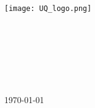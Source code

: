 \begin{titlepage} 
	
	\center %
	
	\texttt{[image: UQ\_logo.png]}\\[1.7cm]	
	
	
	\textsc{\LARGE \institution}\\[1.2cm] 
	
	\textsc{\Large \courseCode}\\[0.7cm] 
	
	\textsc{\large \courseTitle}\\[0.7cm] 
	
	\HRule\\[0.65cm]
	
	{\huge\bfseries \documentTitle}\\[0.3cm]
	
	\HRule\\[1.7cm]
	
	\titlepageAuthors
	
	\vfill %
	{\large\today} 
	
	
	\vfill %
	
\end{titlepage}